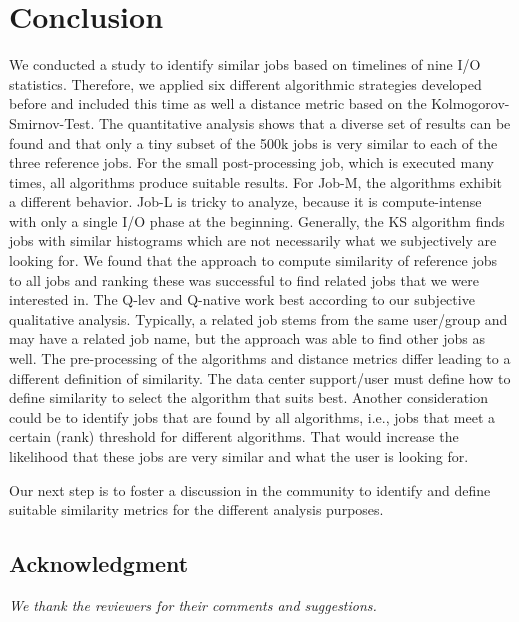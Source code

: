 \documentclass{jhps}
\begin{document}
\section{Conclusion}%
\label{sec:summary}

We conducted a study to identify similar jobs based on timelines of nine I/O statistics.
Therefore, we applied six different algorithmic strategies developed before and included this time as well a distance metric based on the Kolmogorov-Smirnov-Test.
The quantitative analysis shows that a diverse set of results can be found and that only a tiny subset of the 500k jobs is very similar to each of the three reference jobs.
For the small post-processing job, which is executed many times, all algorithms produce suitable results.
For Job-M, the algorithms exhibit a different behavior.
Job-L is tricky to analyze, because it is compute-intense with only a single I/O phase at the beginning.
Generally, the KS algorithm finds jobs with similar histograms which are not necessarily what we subjectively are looking for.
We found that the approach to compute similarity of reference jobs to all jobs and ranking these was successful to find related jobs that we were interested in.
The Q-lev and Q-native work best according to our subjective qualitative analysis.
Typically, a related job stems from the same user/group and may have a related job name, but the approach was able to find other jobs as well.
The pre-processing of the algorithms and distance metrics differ leading to a different definition of similarity.
The data center support/user must define how to define similarity to select the algorithm that suits best.
Another consideration could be to identify jobs that are found by all algorithms, i.e., jobs that meet a certain (rank) threshold for different algorithms.
That would increase the likelihood that these jobs are very similar and what the user is looking for.

Our next step is to foster a discussion in the community to identify and define suitable similarity metrics for the different analysis purposes.



\subsection*{Acknowledgment} %
\textit{We thank the reviewers for their comments and suggestions.}


\end{document}
